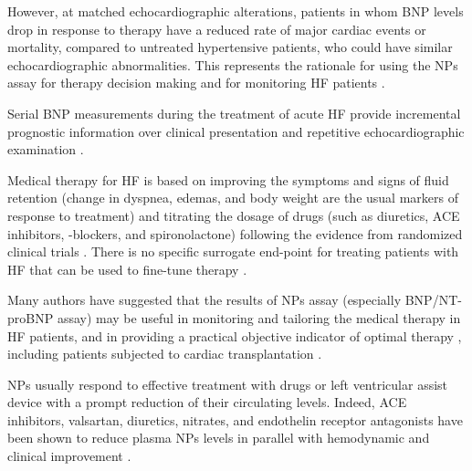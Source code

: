 \documentclass[14pt,a4paper,onecolumn]{extarticle}
\begin{document}
However, at matched echocardiographic alterations, patients in whom BNP levels drop in response to therapy have a reduced rate of major cardiac events or mortality, compared to untreated hypertensive patients, who could have similar echocardiographic abnormalities. This represents the rationale for using the NPs assay for therapy decision making and for monitoring HF patients \citep{bib35} \citep{bib363} \citep{bib364}.

Serial BNP measurements during the treatment of acute HF provide incremental prognostic information over clinical presentation and repetitive echocardiographic examination \citep{bib3179}.

Medical therapy for HF is based on improving the symptoms and signs of fluid retention (change in dyspnea, edemas, and body weight are the usual markers of response to treatment) and titrating the dosage of drugs (such as diuretics, ACE inhibitors, \beta-blockers, and spironolactone) following the evidence from randomized clinical trials \citep{bib365} \citep{bib368} \citep{bib369} \citep{bib370}. There is no specific surrogate end-point for treating patients with HF that can be used to fine-tune therapy \citep{bib365} \citep{bib368} \citep{bib369} \citep{bib370}.

Many authors have suggested that the results of NPs assay (especially BNP/NT-proBNP assay) may be useful in monitoring and tailoring the medical therapy in HF patients, and in providing a practical objective indicator of optimal therapy \citep{bib361} \citep{bib362} \citep{bib363} \citep{bib364} \citep{bib365} \citep{bib368} \citep{bib369} \citep{bib370} \citep{bib385} \citep{bib390} \citep{bib3168} \citep{bib3252} \citep{Troughton2000} \citep{bib3286} \citep{bib3255} \citep{bib3256} \citep{bib3257} \citep{bib3258} \citep{bib3259} \citep{bib3260} \citep{bib3261} \citep{bib3262} \citep{bib3263} \citep{bib3264}  \citep{Mueller2004}, including patients subjected to cardiac transplantation \citep{bib3266}.

NPs usually respond to effective treatment with drugs \citep{bib35} \citep{bib361} \citep{bib362} \citep{bib363} \citep{bib364} \citep{bib365} or left ventricular assist device \citep{bib3267} \citep{bib3268} with a prompt reduction of their circulating levels. Indeed, ACE inhibitors, valsartan, diuretics, nitrates, and endothelin receptor antagonists have been shown to reduce plasma NPs levels in parallel with hemodynamic and clinical improvement \citep{bib362} \citep{bib363} \citep{bib3252} \citep{bib3258} \citep{bib3271} \citep{bib3272} \citep{bib3273} \citep{bib3284} \citep{bib3275} \citep{bib3276} \citep{bib3277}.
\end{document}
